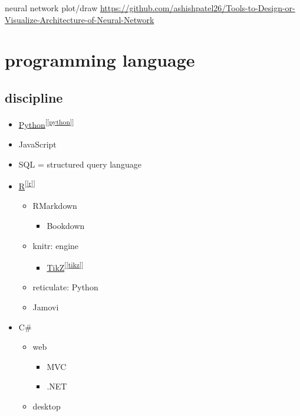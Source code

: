 \documentclass[
]{book}
\providecommand{\tightlist}{%
  \setlength{\itemsep}{0pt}\setlength{\parskip}{0pt}}
\theoremstyle{definition}
\theoremstyle{definition}
\theoremstyle{definition}
\theoremstyle{definition}
\theoremstyle{remark}
\begin{document}
neural network plot/draw
\url{https://github.com/ashishpatel26/Tools-to-Design-or-Visualize-Architecture-of-Neural-Network}

\chapter{programming language}\label{programming-language}

\section{discipline}\label{discipline-2}

\begin{itemize}
\tightlist
\item
  \hyperref[python]{Python}\textsuperscript{{[}\ref{python}{]}}
\item
  JavaScript
\item
  SQL = structured query language
\item
  \hyperref[r]{R}\textsuperscript{{[}\ref{r}{]}}

  \begin{itemize}
  \tightlist
  \item
    RMarkdown

    \begin{itemize}
    \tightlist
    \item
      Bookdown
    \end{itemize}
  \item
    knitr: engine

    \begin{itemize}
    \tightlist
    \item
      \hyperref[tikz]{TikZ}\textsuperscript{{[}\ref{tikz}{]}}
    \end{itemize}
  \item
    reticulate: Python
  \item
    Jamovi
  \end{itemize}
\item
  C\#

  \begin{itemize}
  \tightlist
  \item
    web

    \begin{itemize}
    \tightlist
    \item
      MVC
    \item
      .NET
    \end{itemize}
  \item
    desktop


\end{itemize}
\end{itemize}
\end{document}
